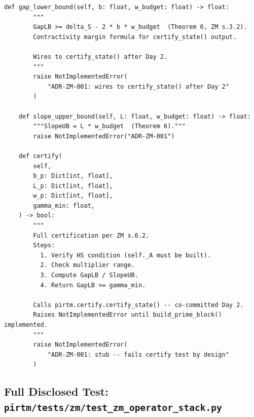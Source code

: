 \documentclass[12pt,letterpaper]{article}
\theoremstyle{definition}
\theoremstyle{remark}
\begin{document}
\begin{lstlisting}[caption={pirtm/zm/operator\_stack.py --- Disclosed stub design},
                   label={lst:zm-stack}]
    def gap_lower_bound(self, b: float, w_budget: float) -> float:
        """
        GapLB >= delta_S - 2 * b * w_budget  (Theorem 6, ZM s.3.2).
        Contractivity margin formula for certify_state() output.

        Wires to certify_state() after Day 2.
        """
        raise NotImplementedError(
            "ADR-ZM-001: wires to certify_state() after Day 2"
        )

    def slope_upper_bound(self, L: float, w_budget: float) -> float:
        """SlopeUB = L * w_budget  (Theorem 6)."""
        raise NotImplementedError("ADR-ZM-001")

    def certify(
        self,
        b_p: Dict[int, float],
        L_p: Dict[int, float],
        w_p: Dict[int, float],
        gamma_min: float,
    ) -> bool:
        """
        Full certification per ZM s.6.2.
        Steps:
          1. Verify HS condition (self._A must be built).
          2. Check multiplier range.
          3. Compute GapLB / SlopeUB.
          4. Return GapLB >= gamma_min.

        Calls pirtm.certify.certify_state() -- co-committed Day 2.
        Raises NotImplementedError until build_prime_block() implemented.
        """
        raise NotImplementedError(
            "ADR-ZM-001: stub -- fails certify test by design"
        )
\end{lstlisting}

\subsection{Full Disclosed Test: \texttt{pirtm/tests/zm/test\_zm\_operator\_stack.py}}
\end{document}
